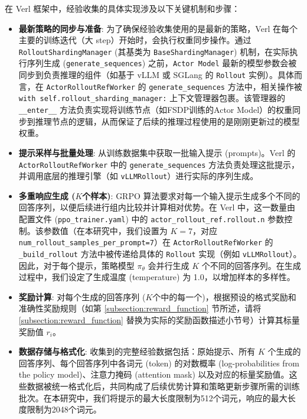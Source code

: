 \documentclass{pkuthesis}
\begin{document}
在 Verl 框架中，经验收集的具体实现涉及以下关键机制和步骤：

\begin{itemize}
    \item \textbf{最新策略的同步与准备}:
    为了确保经验收集使用的是最新的策略，Verl 在每个主要的训练迭代（大 step）开始时，会执行权重同步操作。通过 \texttt{RolloutShardingManager} (其基类为 \texttt{BaseShardingManager}) 机制，在实际执行序列生成 (\texttt{generate\_sequences}) 之前，\texttt{Actor Model} 最新的模型参数会被同步到负责推理的组件（如基于 vLLM 或 SGLang 的 \texttt{Rollout} 实例）。具体而言，在 \texttt{ActorRolloutRefWorker} 的 \texttt{generate\_sequences} 方法中，相关操作被 \texttt{with self.rollout\_sharding\_manager:} 上下文管理器包裹。该管理器的 \texttt{\_\_enter\_\_} 方法负责实现将训练节点（如FSDP训练的Actor Model）的权重同步到推理节点的逻辑，从而保证了后续的推理过程使用的是刚刚更新过的模型权重。

    \item \textbf{提示采样与批量处理}:
    从训练数据集中获取一批输入提示 (prompts)。Verl 的 \texttt{ActorRolloutRefWorker} 中的 \texttt{generate\_sequences} 方法负责处理这批提示，并调用底层的推理引擎（如 \texttt{vLLMRollout}）进行实际的序列生成。

    \item \textbf{多重响应生成 ($K$个样本)}:
    GRPO 算法要求对每一个输入提示生成多个不同的回答序列，以便后续进行组内比较并计算相对优势。在 Verl 中，这一数量由配置文件 (\texttt{ppo\_trainer.yaml}) 中的 \texttt{actor\_rollout\_ref.rollout.n} 参数控制。该参数值（在本研究中，我们设置为 $K=7$，对应 \texttt{num\_rollout\_samples\_per\_prompt=7}）在 \texttt{ActorRolloutRefWorker} 的 \texttt{\_build\_rollout} 方法中被传递给具体的 \texttt{Rollout} 实现（例如 \texttt{vLLMRollout}）。因此，对于每个提示，策略模型 $\pi_{\theta}$ 会并行生成 $K$ 个不同的回答序列。在生成过程中，我们设定了生成温度 (temperature) 为 1.0，以增加样本的多样性。

    \item \textbf{奖励计算}:
    对每个生成的回答序列 ($K$个中的每一个)，根据预设的格式奖励和准确性奖励规则（如第 \ref{subsection:reward_function} 节所述，请将 \ref{subsection:reward_function} 替换为实际的奖励函数描述小节号）计算其标量奖励值 $r_i$。

    \item \textbf{数据存储与格式化}:
    收集到的完整经验数据包括：原始提示、所有 $K$ 个生成的回答序列、每个回答序列中各词元 (token) 的对数概率 (log-probabilities from the policy model)、注意力掩码 (attention mask) 以及对应的标量奖励值。这些数据被统一格式化后，共同构成了后续优势计算和策略更新步骤所需的训练批次。在本研究中，我们将提示的最大长度限制为512个词元，响应的最大长度限制为2048个词元。
\end{itemize}
\end{document}
